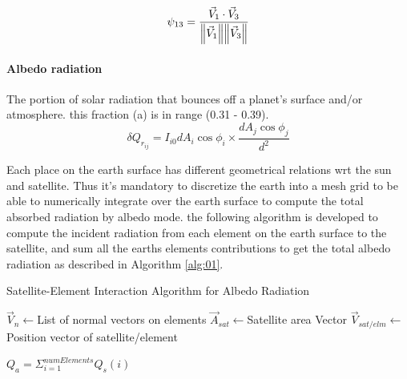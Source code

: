 \documentclass[11pt]{article}
\begin{document}
\begin{equation}\label{eq:psi13}
    \psi_{13} = \frac{\vec{V}_1\cdot \vec{V}_3}{\norm{\vec{V}_1}\norm{\vec{V}_3}}
\end{equation}

\paragraph{Albedo radiation} 
The portion of solar radiation that bounces off a planet's surface and/or atmosphere. this fraction (a) is in range (0.31 - 0.39). 
\begin{equation}
    \delta Q_{r_{ij}} = I_{i0} dA_i\cos{\phi_i}\times\frac{dA_j \cos{\phi_j}}{d^2}
\end{equation}

Each place on the earth surface has different geometrical relations wrt the sun and satellite. Thus it's mandatory to discretize the earth into a mesh grid to be able to numerically integrate over the earth surface to compute the total absorbed radiation by albedo mode. the following algorithm is developed to compute the incident radiation from each element on the earth surface to the satellite, and sum all the earths elements contributions to get the total albedo radiation as described in Algorithm \ref{alg:01}.




{}

\begin{algorithm}[hbt!]
\caption{Satellite-Element Interaction Algorithm for Albedo Radiation}\label{alg:two}
\label{alg:01}
$\vec{V}_{n} \gets $List of normal vectors on elements\;
$\vec{A}_{sat} \gets $Satellite area Vector\;
$\vec{V}_{sat/elm} \gets$ Position vector of satellite/element\;

        
    $Q_a = \Sigma_{i=1}^{numElements}{Q_s(i)}  $
\end{algorithm}
\end{document}
